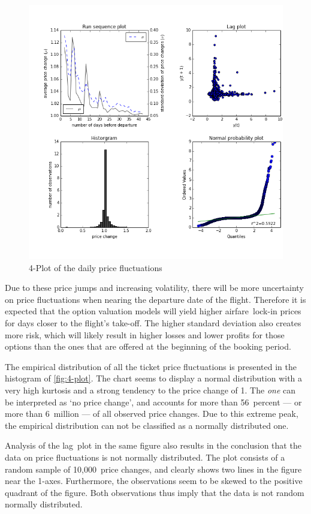 \begin{figure}
\centering
\includegraphics[width=.8\textwidth]{figures/4-plot}
\caption{4-Plot of the daily price fluctuations}
\label{fig:4-plot}
\end{figure}


Due to these price jumps and increasing volatility, there will be more uncertainty on price fluctuations when nearing the departure date of the flight. Therefore it is expected that the option valuation models will yield higher airfare~lock-in prices for days closer to the flight's take-off. The higher standard deviation also creates more risk, which will likely result in higher losses and lower profits for those options than the ones that are offered at the beginning of the booking period.

The empirical distribution of all the ticket price fluctuations is presented in the histogram of \autoref{fig:4-plot}. The chart seems to display a normal distribution with a very high kurtosis and a strong tendency to the price change of 1. The \emph{one} can be interpreted as `no price change', and accounts for more than 56~percent --- or more than 6~million --- of all observed price changes. Due to this extreme peak, the empirical distribution can not be classified as a normally distributed one.

Analysis of the lag~plot in the same figure also results in the conclusion that the data on price fluctuations is not normally distributed. The plot consists of a random sample of 10,000~price changes, and clearly shows two lines in the figure near the 1-axes. Furthermore, the observations seem to be skewed to the positive quadrant of the figure. Both observations thus imply that the data is not random normally distributed.

